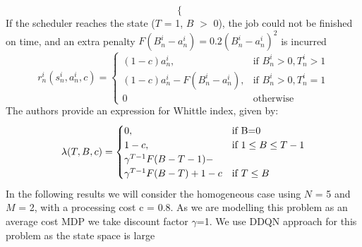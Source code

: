 \documentclass{slides}
\begin{document}
{{\begin{equation*}
\begin{cases}
\end{cases}
\end{equation*}
\newpage
If the scheduler reaches the state ($T$ = 1, $B$ $>$ 0), the job could not be finished on time, and an extra penalty
$F(B_n^i-a_n^i)=0.2(B_n^i-a_n^i)^2$ is incurred    
\begin{equation*}
r_{n}^i(s_{n}^i,a_{n}^i,c)=\begin{cases}
(1-c)a_{n}^i, & \text{if } B_n^i>0,T_n^i>1 \\
(1-c)a_{n}^i-F(B_n^i-a_n^i), &   \text{if } B_n^i>0,T_n^i=1\\
0 & \text{otherwise}
\end{cases}
\end{equation*}
\vspace{-1pt}
\noindent The authors provide an expression for Whittle index, given by:
\begin{equation*}
\lambda(T,B,c)=\begin{cases}
0, & \text{if } $B=0$ \\
1-c, &   \text{if } 1\leq B \leq T-1 \\
    
\gamma^{T-1}F(B-T-1)-\\
    \gamma^{T-1}F(B-T)+1-c
& \text{if }
T \leq B
\end{cases}
\end{equation*}
\newpage
In the following results we will consider the homogeneous case using $N$ = 5 and $M$ = 2, with a processing cost c = 0.8. As we are modelling this problem as an average cost MDP we take discount factor $\gamma$=1. We use DDQN approach for this problem as the state space is large
\begin{center}
    

\end{center}}}
\end{document}
